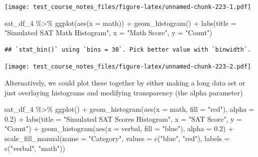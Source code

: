\documentclass[
]{book}
\newenvironment{Shaded}{\begin{snugshade}}{\end{snugshade}}
\newcommand{\AttributeTok}[1]{\textcolor[rgb]{0.77,0.63,0.00}{#1}}
\newcommand{\FloatTok}[1]{\textcolor[rgb]{0.00,0.00,0.81}{#1}}
\newcommand{\FunctionTok}[1]{\textcolor[rgb]{0.00,0.00,0.00}{#1}}
\newcommand{\NormalTok}[1]{#1}
\newcommand{\SpecialCharTok}[1]{\textcolor[rgb]{0.00,0.00,0.00}{#1}}
\newcommand{\StringTok}[1]{\textcolor[rgb]{0.31,0.60,0.02}{#1}}
\begin{document}
\texttt{[image: test\_course\_notes\_files/figure-latex/unnamed-chunk-223-1.pdf]}

\begin{Shaded}
\begin{Highlighting}[]
\NormalTok{sat\_df\_4 }\SpecialCharTok{\%\textgreater{}\%} \FunctionTok{ggplot}\NormalTok{(}\FunctionTok{aes}\NormalTok{(}\AttributeTok{x =}\NormalTok{ math)) }\SpecialCharTok{+}
  \FunctionTok{geom\_histogram}\NormalTok{() }\SpecialCharTok{+}
  \FunctionTok{labs}\NormalTok{(}\AttributeTok{title =} \StringTok{"Simulated SAT Math Histogram"}\NormalTok{,}
       \AttributeTok{x =} \StringTok{"Math Score"}\NormalTok{,}
       \AttributeTok{y =} \StringTok{"Count"}\NormalTok{)}
\end{Highlighting}
\end{Shaded}

\begin{verbatim}
## `stat_bin()` using `bins = 30`. Pick better value with `binwidth`.
\end{verbatim}

\texttt{[image: test\_course\_notes\_files/figure-latex/unnamed-chunk-223-2.pdf]}

Alternatively, we could plot these together by either making a long data set or just overlaying histograms and modifying transparency (the alpha parameter)

\begin{Shaded}
\begin{Highlighting}[]
\NormalTok{sat\_df\_4 }\SpecialCharTok{\%\textgreater{}\%} \FunctionTok{ggplot}\NormalTok{() }\SpecialCharTok{+}
  \FunctionTok{geom\_histogram}\NormalTok{(}\FunctionTok{aes}\NormalTok{(}\AttributeTok{x =}\NormalTok{ math, }\AttributeTok{fill =} \StringTok{"red"}\NormalTok{), }\AttributeTok{alpha =} \FloatTok{0.2}\NormalTok{) }\SpecialCharTok{+}
  \FunctionTok{labs}\NormalTok{(}\AttributeTok{title =} \StringTok{"Simulated SAT Scores Histogram"}\NormalTok{,}
       \AttributeTok{x =} \StringTok{"SAT Score"}\NormalTok{,}
       \AttributeTok{y =} \StringTok{"Count"}\NormalTok{) }\SpecialCharTok{+}
  \FunctionTok{geom\_histogram}\NormalTok{(}\FunctionTok{aes}\NormalTok{(}\AttributeTok{x =}\NormalTok{ verbal, }\AttributeTok{fill =} \StringTok{"blue"}\NormalTok{), }\AttributeTok{alpha =} \FloatTok{0.2}\NormalTok{) }\SpecialCharTok{+}
  \FunctionTok{scale\_fill\_manual}\NormalTok{(}\AttributeTok{name =} \StringTok{"Category"}\NormalTok{, }\AttributeTok{values =} \FunctionTok{c}\NormalTok{(}\StringTok{"blue"}\NormalTok{, }\StringTok{"red"}\NormalTok{), }\AttributeTok{labels =} \FunctionTok{c}\NormalTok{(}\StringTok{"verbal"}\NormalTok{, }\StringTok{"math"}\NormalTok{))}
\end{Highlighting}
\end{Shaded}
\end{document}

